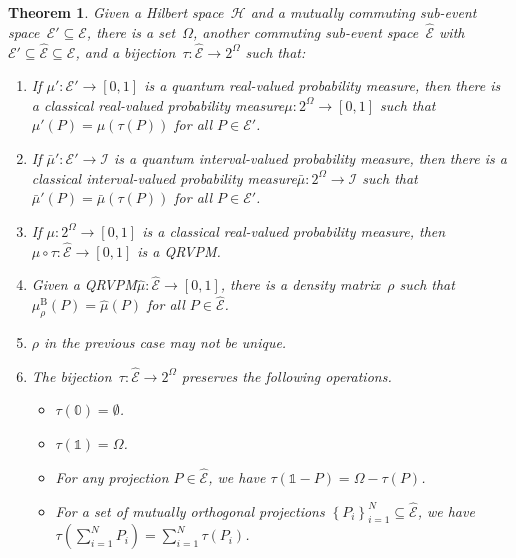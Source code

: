 \documentclass[12pt]{iopart}
\theoremstyle{plain}
\newtheorem{thm}{Theorem}
\theoremstyle{definition}
\theoremstyle{remark}
\newcommand{\Hilb}{\mathcal{H}}
\newcommand{\events}{\ensuremath{\mathcal{E}}}
\newcommand{\nb}{\nolinebreak[3] }
\begin{document}
\begin{thm}\label{thm:sub-event-space}Given a Hilbert space~$\Hilb$
and a mutually commuting sub-event space~$\events'\subseteq\events$,
there is a set~$\Omega$, another commuting sub-event space~$\widehat{\events}$
with $\events'\subseteq\widehat{\events}\subseteq\events$, and a
bijection~$\tau:\widehat{\events}\rightarrow2^{\Omega}$ such that:
\begin{enumerate}
\item \label{enu:sub-event-space-real-quantum2classical}If $\mu':\events'\rightarrow\left[0,1\right]$
is a quantum real-valued probability measure, then there is a classical
real-valued probability measure\nb$\mu:2^{\Omega}\rightarrow\left[0,1\right]$
such that $\mu'\left(P\right)=\mu\left(\tau\left(P\right)\right)$
for all $P\in\events'$.
\item \label{enu:sub-event-space-interval-quantum2classical}If $\bar{\mu}':\events'\rightarrow\mathscr{I}$
is a quantum interval-valued probability measure, then there is a
classical interval-valued probability measure\nb$\bar{\mu}:2^{\Omega}\rightarrow\mathscr{I}$
such that $\bar{\mu}'\left(P\right)=\bar{\mu}\left(\tau\left(P\right)\right)$
for all $P\in\events'$.
\item \label{enu:sub-event-space-real-classical2quantum}If $\mu:2^{\Omega}\rightarrow\left[0,1\right]$
is a classical real-valued probability measure, then $\mu\circ\tau:\widehat{\events}\rightarrow\left[0,1\right]$
is a QRVPM.
\item \label{enu:sub-event-space-Gleason}Given a QRVPM\nb$\widehat{\mu}:\widehat{\events}\rightarrow\left[0,1\right]$,
there is a density matrix~$\rho$ such that $\mu_{\rho}^{\mathrm{B}}\left(P\right)=\widehat{\mu}\left(P\right)$
for all $P\in\widehat{\events}$.
\item $\rho$ in the previous case may not be unique.
\item The bijection~$\tau:\widehat{\events}\rightarrow2^{\Omega}$ preserves
the following operations.
\begin{itemize}
\item $\tau\left(\mathbb{0}\right)=\emptyset$.
\item $\tau\left(\mathbb{1}\right)=\Omega$.
\item For any projection $P\in\widehat{\events}$, we have $\tau\left(\mathbb{1}-P\right)=\Omega-\tau\left(P\right)$.
\item For a set of mutually orthogonal projections $\left\{ P_{i}\right\} _{i=1}^{N}\subseteq\widehat{\events}$,
we have $\tau\left(\sum_{i=1}^{N}P_{i}\right)=\sum_{i=1}^{N}\tau\left(P_{i}\right)$.
\end{itemize}
\end{enumerate}
\end{thm}
\end{document}
